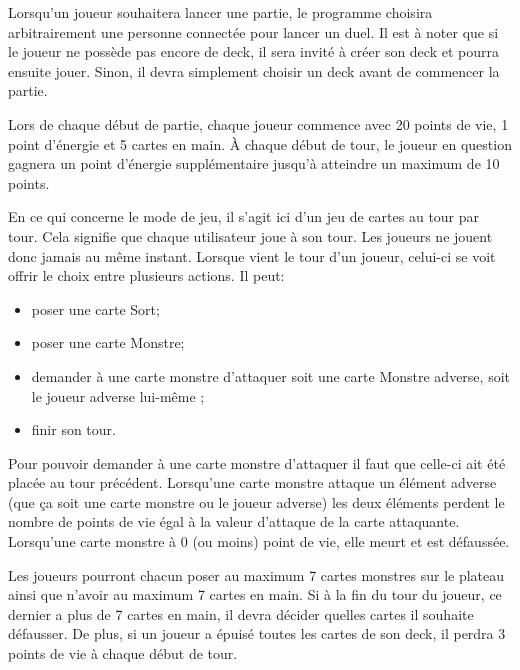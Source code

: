 \documentclass[11pt,a4paper]{article}
\begin{document}
\medbreak

Lorsqu'un joueur souhaitera lancer une partie, le programme choisira arbitrairement une personne connectée pour lancer un duel. Il est à noter que si le joueur ne possède pas encore de deck, il sera invité à créer son deck et pourra ensuite jouer. Sinon, il devra simplement choisir un deck avant de commencer la partie.

\medbreak

Lors de chaque début de partie, chaque joueur commence avec 20 points de vie, 1 point d'énergie et 5 cartes en main. À chaque début de tour, le joueur en question gagnera un point d'énergie supplémentaire jusqu'à atteindre un maximum de 10 points.

\medbreak

En ce qui concerne le mode de jeu, il s'agit ici d'un jeu de cartes au tour par tour.  Cela signifie que chaque utilisateur joue à son tour.  Les joueurs ne jouent donc jamais au même instant.  Lorsque vient le tour d'un joueur, celui-ci se voit offrir le choix entre plusieurs actions. Il peut:

\begin{itemize}
 \item[\textbullet] poser une carte Sort;
 \item[\textbullet] poser une carte Monstre;
 \item[\textbullet] demander à une carte monstre d'attaquer soit une carte Monstre adverse, soit le joueur adverse lui-même ;
 \item[\textbullet] finir son tour.
\end{itemize}

Pour pouvoir demander à une carte monstre d'attaquer il faut que celle-ci ait été placée au tour précédent.  Lorsqu'une carte monstre attaque un élément adverse (que ça soit une carte monstre ou le joueur adverse) les deux éléments perdent le nombre de points de vie égal à la valeur d'attaque de la carte attaquante.  Lorsqu'une carte monstre à 0 (ou moins) point de vie, elle meurt et est défaussée.

\medbreak


Les joueurs pourront chacun poser au maximum 7 cartes monstres sur le plateau ainsi que n'avoir au maximum 7 cartes en main. Si à la fin du tour du joueur, ce dernier a plus de 7 cartes en main, il devra décider quelles cartes il souhaite défausser. De plus, si un joueur a épuisé toutes les cartes de son deck, il perdra 3 points de vie à chaque début de tour.
\end{document}
